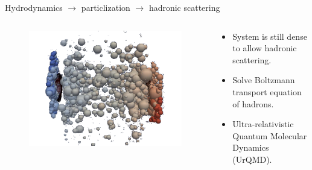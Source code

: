 \documentclass[11pt]{beamer}
\begin{document}
\begin{frame}{Hydrodynamics $\rightarrow$ particlization $\rightarrow$ hadronic scattering}
\begin{columns}
\begin{column}{0.15\textwidth}
\begin{figure}
\begin{center}
   	\includegraphics[width=\textwidth]{pics/new300.png}
	\end{center} 	
  	\end{figure}
  \end{column}
  \begin{column}{0.85\textwidth}
  \begin{itemize}
  	\item System is still dense to allow hadronic scattering.
	\item Solve Boltzmann transport equation of hadrons.
	\item Ultra-relativistic Quantum Molecular Dynamics (UrQMD).
  \end{itemize}
  \end{column}
\end{columns}

\end{frame}


\end{document}

